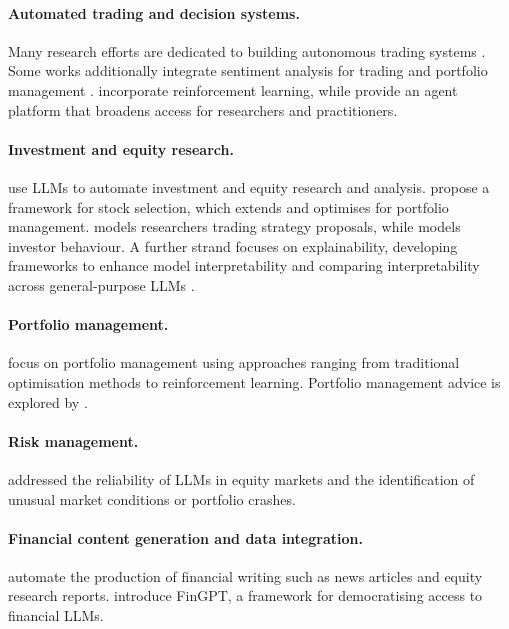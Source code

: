 \documentclass[conference]{IEEEtran}
\begin{document}
\paragraph{Automated trading and decision systems.}
Many research efforts are dedicated to building autonomous trading systems
\cite{yu2024fincon,li2023tradinggpt,yu2023finmem,li2024cryptotrade}.
Some works additionally integrate sentiment analysis for trading and portfolio management
\cite{konstantinidis2024}.
\cite{saqur2024} incorporate reinforcement learning, while \cite{yang2024finrobot} provide
an agent platform that broadens access for researchers and practitioners.

\paragraph{Investment and equity research.}
\cite{papasotiriou2024,li2023multimodal,zhou2024finrobot} use LLMs to
automate investment and equity research and analysis.
\cite{fatouros2024} propose a framework for stock selection, which \cite{fatouros2025}
extends and optimises for portfolio management.
\cite{wang2023alphagpt} models researchers trading strategy proposals, while \cite{wang2024b} models investor
behaviour.
A further strand focuses on explainability, developing frameworks to enhance model
interpretability \cite{koa2024explainable,lopezlira2023,tong2024,zhao2024portfolio} and
comparing interpretability across general-purpose LLMs \cite{abdelsamie2024}.

\paragraph{Portfolio management.}
\cite{ko2024,huang2024portfolio,zhao2024portfolio} focus on
portfolio management using approaches ranging from traditional optimisation methods to
reinforcement learning.
Portfolio management advice is explored by \cite{fieberg2024,lu2025}.

\paragraph{Risk management.}
\cite{park2024,koa2024temporal} addressed the reliability of LLMs in equity markets and the identification of
unusual market conditions or portfolio crashes.

\paragraph{Financial content generation and data integration.}
\cite{nishida2025,pop2024} automate the production of financial writing such as news articles
and equity research reports.
\cite{liu2023fingpt} introduce FinGPT, a framework for democratising access to financial LLMs.
\end{document}
